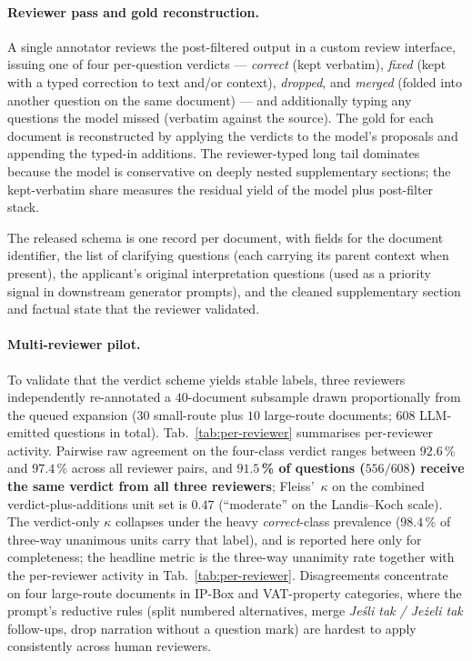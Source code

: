 \paragraph{Reviewer pass and gold reconstruction.}
A single annotator reviews the post-filtered output in a custom
review interface, issuing one of four per-question verdicts ---
\textit{correct} (kept verbatim), \textit{fixed} (kept with a typed
correction to text and/or context), \textit{dropped}, and
\textit{merged} (folded into another question on the same document)
--- and additionally typing any questions the model missed (verbatim
against the source). The gold for each document is reconstructed by
applying the verdicts to the model's proposals and appending the
typed-in additions. The reviewer-typed long tail dominates because
the model is conservative on deeply nested supplementary sections;
the kept-verbatim share measures the residual yield of the model
plus post-filter stack.

The released schema is one record per document, with fields for the
document identifier, the list of clarifying questions (each carrying
its parent context when present), the applicant's original
interpretation questions (used as a priority signal in downstream
generator prompts), and the cleaned supplementary section and factual
state that the reviewer validated.

\paragraph{Multi-reviewer pilot.}
To validate that the verdict scheme yields stable labels, three
reviewers independently re-annotated a $40$-document subsample drawn
proportionally from the queued expansion ($30$ small-route plus
$10$ large-route documents; $608$ LLM-emitted questions in total).
Tab.~\ref{tab:per-reviewer} summarises per-reviewer activity.
Pairwise raw agreement on the four-class verdict ranges between
$92.6$\,\% and $97.4$\,\% across all reviewer pairs, and
\textbf{$91.5$\,\% of questions ($556/608$) receive the same verdict
from all three reviewers}; Fleiss'~$\kappa$ on the combined
verdict-plus-additions unit set is $0.47$ (``moderate'' on the
Landis--Koch scale). The verdict-only $\kappa$ collapses under the
heavy \textit{correct}-class prevalence ($98.4$\,\% of three-way
unanimous units carry that label), and is reported here only for
completeness; the headline metric is the three-way unanimity rate
together with the per-reviewer activity in
Tab.~\ref{tab:per-reviewer}. Disagreements concentrate on four
large-route documents in IP-Box and VAT-property categories, where
the prompt's reductive rules (split numbered alternatives, merge
\emph{Jeśli tak / Jeżeli tak} follow-ups, drop narration without a
question mark) are hardest to apply consistently across human
reviewers.


